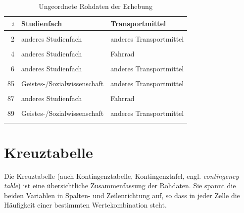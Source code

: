 \documentclass[
  11pt,
  ngerman,
  a4paper,
]{report}
\begin{document}
\begin{table}

\caption{\label{tab:roh}\label{tab:roh}Ungeordnete Rohdaten der Erhebung}
\centering
\begin{tabular}[t]{r>{\raggedright\arraybackslash}p{8cm}>{\raggedright\arraybackslash}p{8cm}}
\toprule
\textbf{$i$} & \textbf{Studienfach} & \textbf{Transportmittel}\\
\midrule
\cellcolor{gray!6}{1} & \cellcolor{gray!6}{Geistes-/Sozialwissenschaft} & \cellcolor{gray!6}{anderes Transportmittel}\\
2 & anderes Studienfach & anderes Transportmittel\\
\cellcolor{gray!6}{3} & \cellcolor{gray!6}{anderes Studienfach} & \cellcolor{gray!6}{anderes Transportmittel}\\
4 & anderes Studienfach & Fahrrad\\
\cellcolor{gray!6}{5} & \cellcolor{gray!6}{Geistes-/Sozialwissenschaft} & \cellcolor{gray!6}{anderes Transportmittel}\\
6 & anderes Studienfach & anderes Transportmittel\\
\cellcolor{gray!6}{...} & \cellcolor{gray!6}{...} & \cellcolor{gray!6}{...}\\
85 & Geistes-/Sozialwissenschaft & anderes Transportmittel\\
\cellcolor{gray!6}{86} & \cellcolor{gray!6}{anderes Studienfach} & \cellcolor{gray!6}{anderes Transportmittel}\\
87 & anderes Studienfach & Fahrrad\\
\cellcolor{gray!6}{88} & \cellcolor{gray!6}{anderes Studienfach} & \cellcolor{gray!6}{anderes Transportmittel}\\
89 & Geistes-/Sozialwissenschaft & anderes Transportmittel\\
\cellcolor{gray!6}{90} & \cellcolor{gray!6}{Geistes-/Sozialwissenschaft} & \cellcolor{gray!6}{anderes Transportmittel}\\
\bottomrule
\end{tabular}
\end{table}

\hypertarget{kreuztabelle}{%
\section{Kreuztabelle}\label{kreuztabelle}}

Die Kreuztabelle (auch Kontingenztabelle, Kontingenztafel, engl. \emph{contingency table}) ist eine übersichtliche Zusammenfassung der Rohdaten. Sie spannt die beiden Variablen in Spalten- und Zeilenrichtung auf, so dass in jeder Zelle die Häufigkeit einer bestimmten Wertekombination steht.
\end{document}
